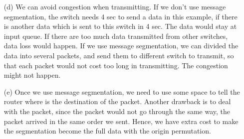 \documentclass[12pt,a4paper]{article}
\begin{document}
\begin{enumerate}
    \item[(d)]
        We can avoid congestion when transmitting. If we don't use message segmentation, the switch needs 4 sec to send a data in this example, if there is another data which is sent to this switch in 4 sec. The data would stay at input queue.
        If there are too much data transmitted from other switches, data loss would happen. If we use message segmentation, we can divided the data into several packets, and send them to different switch to transmit, so that each packet would not cost too long in transmitting.
        The congestion might not happen.
    \item[(e)]
        Once we use message segmentation, we need to use some space to tell the router where is the destination of the packet.
        Another drawback is to deal with the packet, since the packet would not go through the same way, the packet arrived in the same order we sent.
        Hence, we have extra cost to make the segmentation become the full data with the origin permutation.
\end{enumerate}
\end{document}
